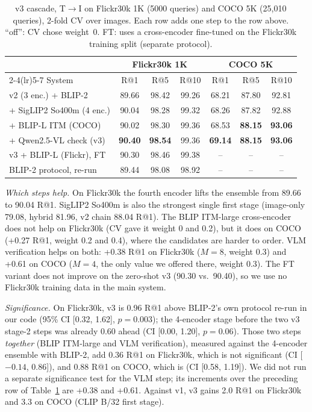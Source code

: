 \documentclass[conference]{IEEEtran}
\newcommand{\RA}{\ensuremath{\rightarrow}}
\newcommand{\best}[1]{\textbf{#1}}
\begin{document}
\begin{table}[t]
\centering
\caption{v3 cascade, T\RA I on Flickr30k 1K (5000 queries) and COCO 5K (25{,}010 queries), 2-fold CV over images.
Each row adds one step to the row above. ``off'': CV chose weight~0. FT: uses a cross-encoder fine-tuned on the
Flickr30k training split (separate protocol).}
\label{tab:v3}
\setlength{\tabcolsep}{2pt}
\begin{tabular}{l ccc ccc}
\toprule
& \multicolumn{3}{c}{Flickr30k 1K} & \multicolumn{3}{c}{COCO 5K} \\
\cmidrule(lr){2-4}\cmidrule(lr){5-7}
System & R@1 & R@5 & R@10 & R@1 & R@5 & R@10 \\
\midrule
v2 (3 enc.) + BLIP-2               & 89.66 & 98.42 & 99.26 & 68.21 & 87.80 & 92.81 \\
+ SigLIP2 So400m (4 enc.)          & 90.04 & 98.28 & 99.32 & 68.26 & 87.82 & 92.88 \\
+ BLIP-L ITM (COCO)                & 90.02 & 98.30 & 99.36 & 68.53 & \best{88.15} & \best{93.06} \\
+ Qwen2.5-VL check (v3)            & \best{90.40} & \best{98.54} & 99.36 & \best{69.14} & \best{88.15} & \best{93.06} \\
\midrule
v3 + BLIP-L (Flickr), FT           & 90.30 & 98.46 & 99.38 & -- & -- & -- \\
\midrule
BLIP-2 protocol, re-run            & 89.44 & 98.08 & 98.92 & -- & -- & -- \\
\bottomrule
\end{tabular}
\end{table}

\emph{Which steps help.} On Flickr30k the fourth encoder lifts the ensemble from 89.66 to 90.04 R@1. SigLIP2
So400m is also the strongest single first stage (image-only 79.08, hybrid 81.96, v2 chain 88.04 R@1). The BLIP ITM-large
cross-encoder does not help on Flickr30k (CV gave it weight 0 and 0.2), but it does on COCO (+0.27 R@1, weight 0.2
and 0.4), where the candidates are harder to order. VLM verification helps on both: +0.38 R@1 on Flickr30k
($M=8$, weight 0.3) and +0.61 on COCO ($M=4$, the only value we offered there, weight 0.3). The FT variant does
not improve on the zero-shot v3 (90.30 vs.\ 90.40), so we use no Flickr30k training data in the main system.

\emph{Significance.} On Flickr30k, v3 is 0.96 R@1 above BLIP-2's own protocol re-run in our code (95\% CI [0.32,
1.62], $p=0.003$); the 4-encoder stage before the two v3 stage-2 steps was already 0.60 ahead (CI [0.00, 1.20],
$p=0.06$). Those two steps \emph{together} (BLIP ITM-large and VLM verification), measured against the 4-encoder
ensemble with BLIP-2, add 0.36 R@1 on Flickr30k, which is not significant (CI [$-0.14$, 0.86]), and 0.88 R@1 on
COCO, which is (CI [0.58, 1.19]). We did not run a separate significance test for the VLM step; its increments
over the preceding row of Table~\ref{tab:v3} are +0.38 and +0.61. Against v1, v3 gains 2.0 R@1 on Flickr30k and 3.3
on COCO (CLIP B/32 first stage).
\end{document}
